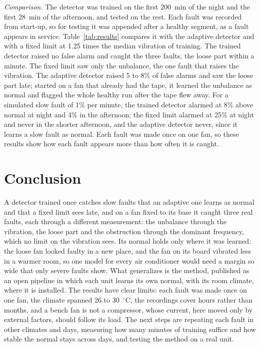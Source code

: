 \documentclass[english,hidelinks]{sbrt}
\begin{document}
\textit{Comparison.} The detector was trained on the first 200~min of the night and the first 28~min of the afternoon, and tested on the rest. Each fault was recorded from start-up, so for testing it was appended after a healthy segment, as a fault appears in service. Table~\ref{tab:results} compares it with the adaptive detector and with a fixed limit at 1.25 times the median vibration of training. The trained detector raised no false alarm and caught the three faults, the loose part within a minute. The fixed limit saw only the unbalance, the one fault that raises the vibration. The adaptive detector raised 5 to 8\% of false alarms and saw the loose part late; started on a fan that already had the tape, it learned the unbalance as normal and flagged the whole healthy run after the tape flew away. For a simulated slow fault of 1\% per minute, the trained detector alarmed at 8\% above normal at night and 4\% in the afternoon; the fixed limit alarmed at 25\% at night and never in the shorter afternoon, and the adaptive detector never, since it learns a slow fault as normal. Each fault was made once on one fan, so these results show how each fault appears more than how often it is caught.

\section{Conclusion}
\label{sec:conclusion}

A detector trained once catches slow faults that an adaptive one learns as normal and that a fixed limit sees late, and on a fan fixed to its base it caught three real faults, each through a different measurement: the unbalance through the vibration, the loose part and the obstruction through the dominant frequency, which no limit on the vibration sees. Its normal holds only where it was learned: the loose fan looked faulty in a new place, and the fan on its board vibrated less in a warmer room, so one model for every air conditioner would need a margin so wide that only severe faults show. What generalizes is the method, published as an open pipeline in which each unit learns its own normal, with its room climate, where it is installed. The results have clear limits: each fault was made once on one fan, the climate spanned 26 to 30~$^\circ$C, the recordings cover hours rather than months, and a bench fan is not a compressor, whose current, here moved only by external factors, should follow its load. The next steps are repeating each fault in other climates and days, measuring how many minutes of training suffice and how stable the normal stays across days, and testing the method on a real unit.



\end{document}
